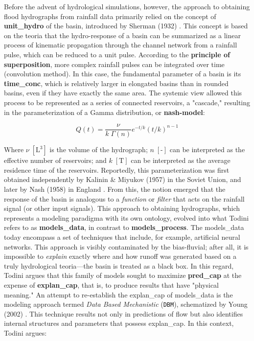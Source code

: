 \documentclass[./main_en.tex]{subfiles}
\begin{document}
\par Before the advent of hydrological simulations, however, the approach to obtaining flood hydrographs from rainfall data primarily relied on the concept of \textbf{\gls{unit_hydro}} of the basin, introduced by Sherman (1932) \cite{Sherman1932a}. This concept is based on the \gls{teoria} that the \gls{hydro-response} of a basin can be summarized as a linear process of kinematic propagation through the channel network from a rainfall pulse, which can be reduced to a unit pulse. According to the \textbf{principle of superposition}, more complex rainfall pulses can be integrated over time (convolution method). In this case, the fundamental parameter of a basin is its \textbf{\gls{time_conc}}, which is relatively larger in elongated basins than in rounded basins, even if they have exactly the same area. The systemic view allowed this process to be represented as a series of connected reservoirs, a "cascade," resulting in the parameterization of a Gamma distribution, or \textbf{\gls{nash-model}}:
\begin{linenomath*}
\begin{equation}
\label{eq:kalinin}
Q(t) = \frac{\nu}{k\; \Gamma(n)} e^{-t/k} (t/k )^{n-1}
\end{equation}
\end{linenomath*}
\noindent Where $\nu \; [\text{L}^{3}]$ is the volume of the hydrograph; $n \; [\text{-}]$ can be interpreted as the effective number of reservoirs; and $k \; [\text{T}]$ can be interpreted as the average residence time of the reservoirs. Reportedly, this parameterization was first obtained independently by Kalinin \& Miyukov (1957) \cite{Kalinin1957a} in the Soviet Union, and later by Nash (1958) in England \cite{Nash1958a}. From this, the notion emerged that the response of the basin is analogous to a \textit{function} or \textit{filter} that acts on the rainfall signal (or other input signals). This approach to obtaining hydrographs, which represents a modeling \gls{paradigma} with its own ontology, evolved into what Todini \cite{Todini2007a} refers to as \textbf{\gls{models_data}}, in contrast to \textbf{\gls{models_process}}. The \gls{models_data} today encompass a set of techniques that include, for example, artificial neural networks. This approach is visibly contaminated by the \gls{bias-fluvial}; after all, it is impossible to \textit{explain} exactly where and how runoff was generated based on a truly hydrological \gls{teoria}—the basin is treated as a black box. In this regard, Todini argues that this family of models sought to maximize \textbf{\gls{pred_cap}} at the expense of \textbf{\gls{explan_cap}}, that is, to produce results that have "physical meaning." An attempt to re-establish the \gls{explan_cap} of \gls{models_data} is the modeling approach termed \textit{Data Based Mechanistic} (\texttt{DBM}), schematized by Young (2002) \cite{Young2002a}. This technique results not only in predictions of flow but also identifies internal structures and \gls{parameters} that possess \gls{explan_cap}. In this context, Todini argues:
\end{document}

